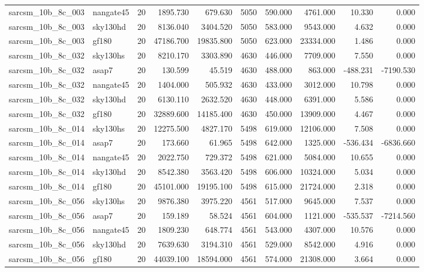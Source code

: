 \begin{longtable}{llrrrrrrrr}
sarcsm\_10b\_8c\_003 & nangate45 & 20 & 1895.730 & 679.630 & 5050 & 590.000 & 4761.000 & 10.330 & 0.000 \\
sarcsm\_10b\_8c\_003 & sky130hd & 20 & 8136.040 & 3404.520 & 5050 & 583.000 & 9543.000 & 4.632 & 0.000 \\
sarcsm\_10b\_8c\_003 & gf180 & 20 & 47186.700 & 19835.800 & 5050 & 623.000 & 23334.000 & 1.486 & 0.000 \\
sarcsm\_10b\_8c\_032 & sky130hs & 20 & 8210.170 & 3303.890 & 4630 & 446.000 & 7709.000 & 7.550 & 0.000 \\
sarcsm\_10b\_8c\_032 & asap7 & 20 & 130.599 & 45.519 & 4630 & 488.000 & 863.000 & -488.231 & -7190.530 \\
sarcsm\_10b\_8c\_032 & nangate45 & 20 & 1404.000 & 505.932 & 4630 & 433.000 & 3012.000 & 10.798 & 0.000 \\
sarcsm\_10b\_8c\_032 & sky130hd & 20 & 6130.110 & 2632.520 & 4630 & 448.000 & 6391.000 & 5.586 & 0.000 \\
sarcsm\_10b\_8c\_032 & gf180 & 20 & 32889.600 & 14185.400 & 4630 & 450.000 & 13909.000 & 4.467 & 0.000 \\
sarcsm\_10b\_8c\_014 & sky130hs & 20 & 12275.500 & 4827.170 & 5498 & 619.000 & 12106.000 & 7.508 & 0.000 \\
sarcsm\_10b\_8c\_014 & asap7 & 20 & 173.660 & 61.965 & 5498 & 642.000 & 1325.000 & -536.434 & -6836.660 \\
sarcsm\_10b\_8c\_014 & nangate45 & 20 & 2022.750 & 729.372 & 5498 & 621.000 & 5084.000 & 10.655 & 0.000 \\
sarcsm\_10b\_8c\_014 & sky130hd & 20 & 8542.380 & 3563.420 & 5498 & 606.000 & 10324.000 & 5.034 & 0.000 \\
sarcsm\_10b\_8c\_014 & gf180 & 20 & 45101.000 & 19195.100 & 5498 & 615.000 & 21724.000 & 2.318 & 0.000 \\
sarcsm\_10b\_8c\_056 & sky130hs & 20 & 9876.380 & 3975.220 & 4561 & 517.000 & 9645.000 & 7.537 & 0.000 \\
sarcsm\_10b\_8c\_056 & asap7 & 20 & 159.189 & 58.524 & 4561 & 604.000 & 1121.000 & -535.537 & -7214.560 \\
sarcsm\_10b\_8c\_056 & nangate45 & 20 & 1809.230 & 648.774 & 4561 & 543.000 & 4307.000 & 10.576 & 0.000 \\
sarcsm\_10b\_8c\_056 & sky130hd & 20 & 7639.630 & 3194.310 & 4561 & 529.000 & 8542.000 & 4.916 & 0.000 \\
sarcsm\_10b\_8c\_056 & gf180 & 20 & 44039.100 & 18594.000 & 4561 & 574.000 & 21308.000 & 3.664 & 0.000 \\

\end{longtable}
